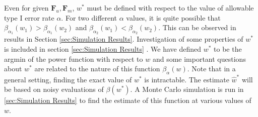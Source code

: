\documentclass[11pt]{article} %
\begin{document}
Even for  given $\mathbf{F}_u,\mathbf{F}_m$,   $w^*$ must be defined with respect to the value of allowable type I error rate $\alpha$.  For two different $\alpha$ values, it is quite possible that $\beta_{\alpha_1}(w_1)>\beta_{\alpha_1}(w_2)$  and $\beta_{\alpha_2}(w_1)<\beta_{\alpha_2}(w_2)$. This can be observed in results in Section \ref{sec:Simulation Results}.  
Investigation of some  properties of $w^{*}$  is included in section  \ref{sec:Simulation Results} .
We have defined $w^*$ to be the argmin of  the power function with respect to $w$ and some important questions about $w^*$ are  related to the nature of this function $\beta_{\alpha}\left( w\right)$.
Note that in a general setting, finding the exact value of $w^*$ is intractable. The estimate $\hat{w}^*$ will be based on noisy evaluations of $\beta(w^*)$.  A Monte Carlo simulation is run in   \ref{sec:Simulation Results} 
to find the estimate of this function at various values of $w$.
\end{document}
